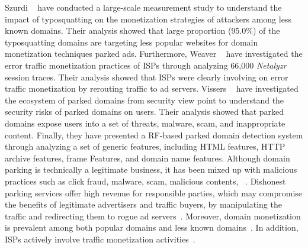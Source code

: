 Szurdi \etal~ have conducted a large-scale measurement study to understand the impact of typosquatting on the monetization strategies of attackers among less known domains. Their analysis showed that large proportion (95.0\%) of the typosquatting domains are targeting less popular websites for domain monetization techniques \eg parked ads. Furthermore, Weaver \etal~ have investigated the error traffic monetization practices of ISPs through analyzing 66,000 \textit{Netalyzr} session traces. Their analysis showed that ISPs were clearly involving on error traffic monetization by rerouting traffic to ad servers. 
Vissers \etal~ have investigated the ecosystem of parked domains from security view point to understand the security risks of parked domains on users. Their analysis showed that parked domains expose users into a set of threats, \eg malware, scam, and inappropriate content. Finally, they have presented a RF-based parked domain detection system through analyzing a set of generic features, including HTML features, HTTP archive features, frame Features, and domain name features. 
 Although domain parking is technically a legitimate business, it has been mixed up with malicious practices such as click fraud, malware, scam, malicious contents, \etc~. Dishonest parking services offer high revenue for responsible parties, which may compromise the benefits of legitimate advertisers and traffic buyers, by manipulating the traffic and redirecting them to rogue ad servers~. Moreover, domain monetization is prevalent among both popular domains and less known domains~. In addition, ISPs actively involve traffic monetization activities~.

